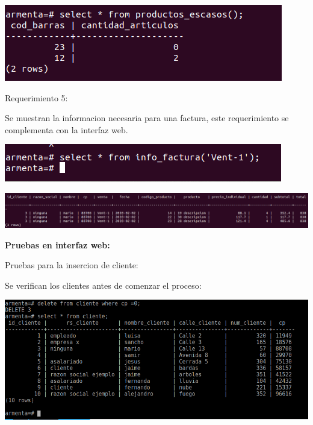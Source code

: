 \documentclass[12pt, letterpaper]{article}     %
\begin{document}
		\begin{center}
 	  	\includegraphics[scale=0.5]{4_prod_escasos}
		\end{center}
		
		\vspace{5mm} %

		Requerimiento 5:
		
		Se muestran la informacion necesaria para una factura, este requerimiento se complementa con la interfaz web.
		
		\begin{center}
 	  	\includegraphics[scale=0.5]{5_factura_1}
		\end{center}
		
		\begin{center}
 	  	\includegraphics[scale=0.35]{5_factura_2}
		\end{center}
			
		
		\vspace{5mm} %

		\textbf{Pruebas en interfaz web:}
		\vspace{5mm} %
		
		Pruebas para la insercion de cliente:

		Se verifican los clientes antes de comenzar el proceso:
		
		\begin{center}
 	  	\includegraphics[scale=0.5]{web_cliente_prev}
		\end{center}
		
\end{document}
